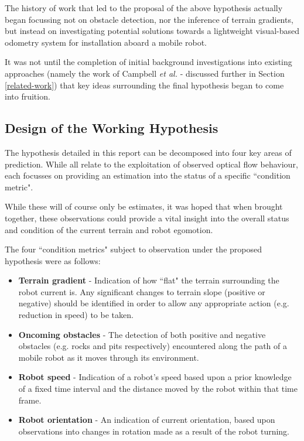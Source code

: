 The history of work that led to the proposal of the above hypothesis actually began focussing not on obstacle detection, nor the inference of terrain gradients, but instead on investigating potential solutions towards a lightweight visual-based odometry system for installation aboard a mobile robot. 

It was not until the completion of initial background investigations into existing approaches (namely the work of Campbell \textit{et al.} \cite{campbell} - discussed further in Section \ref{related-work}) that key ideas surrounding the final hypothesis began to come into fruition. 

\subsection{Design of the Working Hypothesis} 

The hypothesis detailed in this report can be decomposed into four key areas of prediction. While all relate to the exploitation of observed optical flow behaviour, each focusses on providing an estimation into the status of a specific ``condition metric". 

While these will of course only be estimates, it was hoped that when brought together, these observations could provide a vital insight into the overall status and condition of the current terrain and robot egomotion. 

The four ``condition metrics" subject to observation under the proposed hypothesis were as follows:

\begin{itemize}
	\item \textbf{Terrain gradient} - Indication of how ``flat" the terrain surrounding the robot current is. Any significant changes to terrain slope (positive or negative) should be identified in order to allow any appropriate action (e.g. reduction in speed) to be taken.
	\item  \textbf{Oncoming obstacles} - The detection of both positive and negative obstacles (e.g. rocks and pits respectively) encountered along the path of a mobile robot as it moves through its environment. 
	\item \textbf{Robot speed} - Indication of a robot's speed based upon a prior knowledge of a fixed time interval and the distance moved by the robot within that time frame.
	\item \textbf{Robot orientation} - An indication of current orientation, based upon observations into changes in rotation made as a result of the robot turning. 
	
\end{itemize} 

